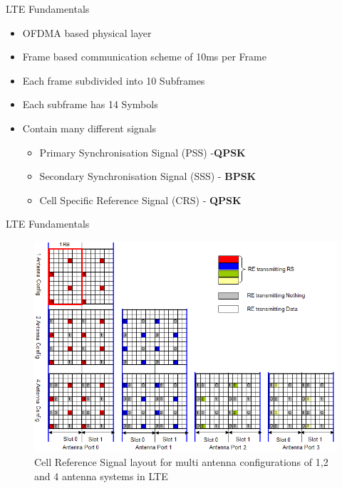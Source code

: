 \documentclass[10pt,t]{beamer}
\begin{document}
\begin{frame}{LTE Fundamentals}
    \begin{itemize}
        \item OFDMA based physical layer
            \bigskip
        \item Frame based communication scheme of 10\si{\milli\second} per Frame
            \bigskip
            \pause
        \item Each frame subdivided into 10 Subframes
            \pause
            \bigskip
        \item Each subframe has 14 Symbols
            \pause
            \bigskip
        \item Contain many different signals
            \begin{itemize}
                \item \alert<+>{Primary Synchronisation Signal (PSS) -\textbf{QPSK}}
                \item \alert<+>{Secondary Synchronisation Signal (SSS) - \textbf{BPSK}}
                \item \alert<+>{Cell Specific Reference Signal (CRS) - \textbf{QPSK}}
            \end{itemize}
    \end{itemize}
\end{frame}


\begin{frame}{LTE Fundamentals}
    \begin{figure}[H]
        \begin{center}
            \includegraphics[width=0.75\linewidth]{../images/CRSMultiAntenna.png}
            \caption{Cell Reference Signal layout for multi antenna configurations of 1,2 and 4 antenna systems in LTE}
            \label{fig:CRSMultiAntenna}
        \end{center}
    \end{figure}
\end{frame}
\end{document}
